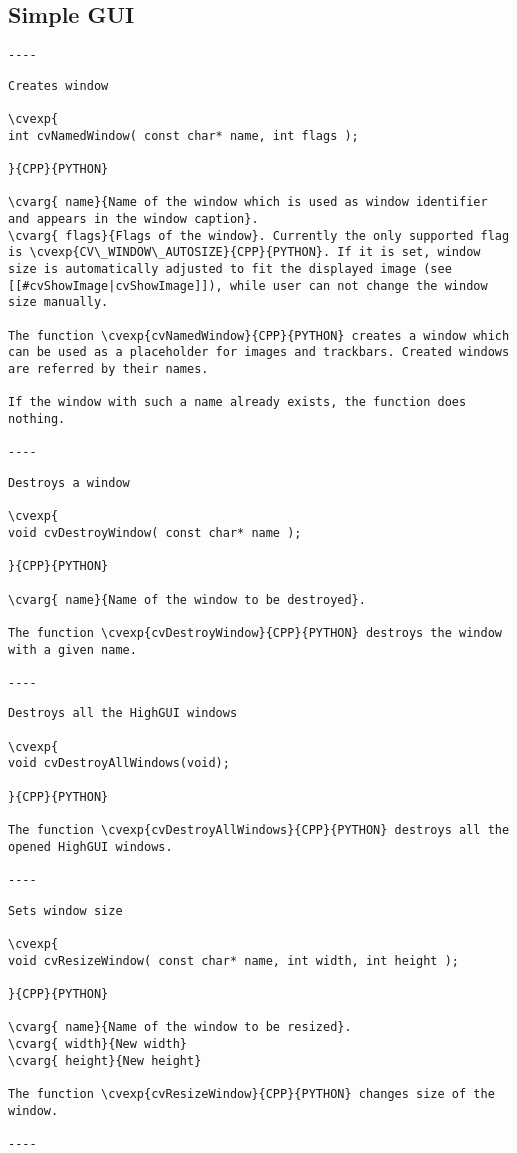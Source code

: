 \subsection{Simple GUI}
\begin{verbatim}
----

\end{verbatim}
\begin{verbatim}
Creates window

\cvexp{
int cvNamedWindow( const char* name, int flags );

}{CPP}{PYTHON}

\cvarg{ name}{Name of the window which is used as window identifier and appears in the window caption}.
\cvarg{ flags}{Flags of the window}. Currently the only supported flag is \cvexp{CV\_WINDOW\_AUTOSIZE}{CPP}{PYTHON}. If it is set, window size is automatically adjusted to fit the displayed image (see [[#cvShowImage|cvShowImage]]), while user can not change the window size manually.

The function \cvexp{cvNamedWindow}{CPP}{PYTHON} creates a window which can be used as a placeholder for images and trackbars. Created windows are referred by their names.

If the window with such a name already exists, the function does nothing.

----
\end{verbatim}
\begin{verbatim}
Destroys a window

\cvexp{
void cvDestroyWindow( const char* name );

}{CPP}{PYTHON}

\cvarg{ name}{Name of the window to be destroyed}.

The function \cvexp{cvDestroyWindow}{CPP}{PYTHON} destroys the window with a given name.

----
\end{verbatim}
\begin{verbatim}
Destroys all the HighGUI windows

\cvexp{
void cvDestroyAllWindows(void);

}{CPP}{PYTHON}

The function \cvexp{cvDestroyAllWindows}{CPP}{PYTHON} destroys all the opened HighGUI windows.

----
\end{verbatim}
\begin{verbatim}
Sets window size

\cvexp{
void cvResizeWindow( const char* name, int width, int height );

}{CPP}{PYTHON}

\cvarg{ name}{Name of the window to be resized}.
\cvarg{ width}{New width}
\cvarg{ height}{New height}

The function \cvexp{cvResizeWindow}{CPP}{PYTHON} changes size of the window.

----
\end{verbatim}
